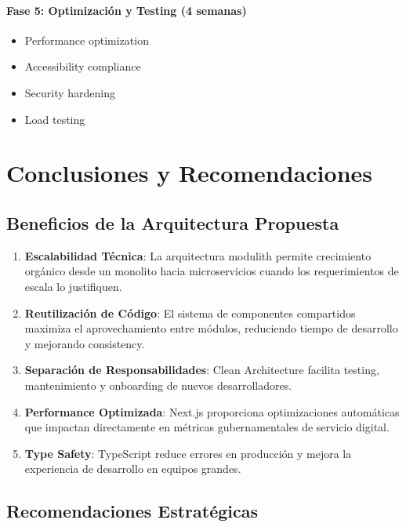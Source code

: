 \documentclass[12pt,a4paper]{article}
\begin{document}
\paragraph{Fase 5: Optimización y Testing (4 semanas)}
\begin{itemize}
    \item Performance optimization
    \item Accessibility compliance
    \item Security hardening
    \item Load testing
\end{itemize}

\section{Conclusiones y Recomendaciones}

\subsection{Beneficios de la Arquitectura Propuesta}

\begin{enumerate}
    \item \textbf{Escalabilidad Técnica}: La arquitectura modulith permite crecimiento orgánico desde un monolito hacia microservicios cuando los requerimientos de escala lo justifiquen.
    
    \item \textbf{Reutilización de Código}: El sistema de componentes compartidos maximiza el aprovechamiento entre módulos, reduciendo tiempo de desarrollo y mejorando consistency.
    
    \item \textbf{Separación de Responsabilidades}: Clean Architecture facilita testing, mantenimiento y onboarding de nuevos desarrolladores.
    
    \item \textbf{Performance Optimizada}: Next.js proporciona optimizaciones automáticas que impactan directamente en métricas gubernamentales de servicio digital.
    
    \item \textbf{Type Safety}: TypeScript reduce errores en producción y mejora la experiencia de desarrollo en equipos grandes.
\end{enumerate}

\subsection{Recomendaciones Estratégicas}
\end{document}
